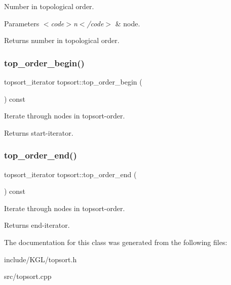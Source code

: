 Number in topological order.


\begin{DoxyParams}{Parameters}
{\em $<$code$>$n$<$/code$>$} & node. \\
\hline
\end{DoxyParams}
\begin{DoxyReturn}{Returns}
number in topological order. 
\end{DoxyReturn}
\mbox{\label{classtopsort_ab220dcce845e001b0f737d0dc7751abc}} 
\subsubsection{\texorpdfstring{top\+\_\+order\+\_\+begin()}{top\_order\_begin()}}
{\footnotesize\ttfamily topsort\+\_\+iterator topsort\+::top\+\_\+order\+\_\+begin (\begin{DoxyParamCaption}{ }\end{DoxyParamCaption}) const\hspace{0.3cm}{\ttfamily [inline]}}

Iterate through nodes in topsort-\/order.

\begin{DoxyReturn}{Returns}
start-\/iterator. 
\end{DoxyReturn}
\mbox{\label{classtopsort_ac9b784654ae0c4e9736931d63d03291b}} 
\subsubsection{\texorpdfstring{top\+\_\+order\+\_\+end()}{top\_order\_end()}}
{\footnotesize\ttfamily topsort\+\_\+iterator topsort\+::top\+\_\+order\+\_\+end (\begin{DoxyParamCaption}{ }\end{DoxyParamCaption}) const\hspace{0.3cm}{\ttfamily [inline]}}

Iterate through nodes in topsort-\/order.

\begin{DoxyReturn}{Returns}
end-\/iterator. 
\end{DoxyReturn}


The documentation for this class was generated from the following files\+:\begin{DoxyCompactItemize}
\item 
include/\+K\+G\+L/topsort.\+h\item 
src/topsort.\+cpp\end{DoxyCompactItemize}
